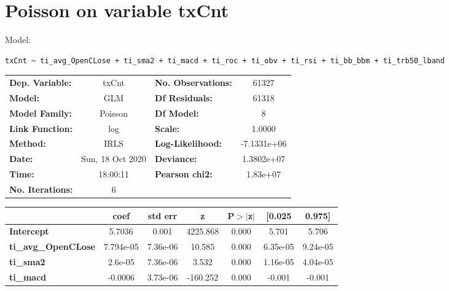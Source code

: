 \section{Poisson on variable txCnt}

Model: \begin{verbatim}txCnt ~ ti_avg_OpenCLose + ti_sma2 + ti_macd + ti_roc + ti_obv + ti_rsi + ti_bb_bbm + ti_trb50_lband\end{verbatim}

\begin{center}
\begin{tabular}{lclc}
\toprule
\textbf{Dep. Variable:}     &      txCnt       & \textbf{  No. Observations:  } &     61327    \\
\textbf{Model:}             &       GLM        & \textbf{  Df Residuals:      } &     61318    \\
\textbf{Model Family:}      &     Poisson      & \textbf{  Df Model:          } &         8    \\
\textbf{Link Function:}     &       log        & \textbf{  Scale:             } &     1.0000   \\
\textbf{Method:}            &       IRLS       & \textbf{  Log-Likelihood:    } & -7.1331e+06  \\
\textbf{Date:}              & Sun, 18 Oct 2020 & \textbf{  Deviance:          } &  1.3802e+07  \\
\textbf{Time:}              &     18:00:11     & \textbf{  Pearson chi2:      } &   1.83e+07   \\
\textbf{No. Iterations:}    &        6         & \textbf{                     } &              \\
\bottomrule
\end{tabular}
\begin{tabular}{lcccccc}
                            & \textbf{coef} & \textbf{std err} & \textbf{z} & \textbf{P$> |$z$|$} & \textbf{[0.025} & \textbf{0.975]}  \\
\midrule
\textbf{Intercept}          &       5.7036  &        0.001     &  4225.868  &         0.000        &        5.701    &        5.706     \\
\textbf{ti\_avg\_OpenCLose} &    7.794e-05  &     7.36e-06     &    10.585  &         0.000        &     6.35e-05    &     9.24e-05     \\
\textbf{ti\_sma2}           &      2.6e-05  &     7.36e-06     &     3.532  &         0.000        &     1.16e-05    &     4.04e-05     \\
\textbf{ti\_macd}           &      -0.0006  &     3.73e-06     &  -160.252  &         0.000        &       -0.001    &       -0.001     \\

\end{tabular}
\end{center}
